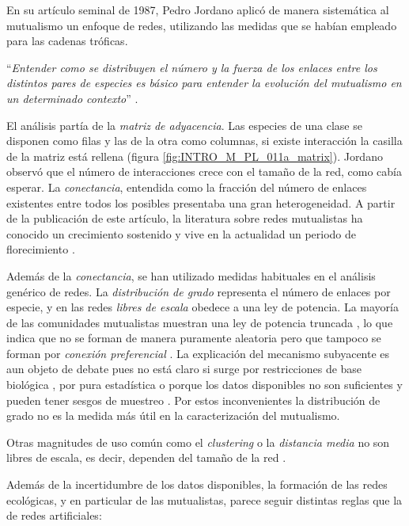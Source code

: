 En su artículo seminal de 1987, Pedro Jordano aplicó de manera sistemática al mutualismo un enfoque de redes, utilizando las medidas que se habían empleado para las cadenas tróficas.

\enquote{\itshape Entender como se distribuyen el número y la fuerza de los enlaces entre los distintos pares de especies es básico para entender la evolución del mutualismo en un determinado contexto} \cite{jordano1987patterns}.

El análisis partía de la \textit{matriz de adyacencia}. Las especies de una clase se disponen como filas y las de la otra como columnas, si existe interacción la casilla de la matriz está rellena (figura \ref{fig:INTRO_M_PL_011a_matrix}). Jordano observó que el número de interacciones crece con el tamaño de la red, como cabía esperar. La \textit{conectancia}, entendida como la fracción del número de enlaces existentes entre todos los posibles presentaba una gran heterogeneidad. A partir de la publicación de este artículo, la literatura sobre redes mutualistas ha conocido un crecimiento sostenido y vive en la actualidad un periodo de florecimiento \cite{gu2015emerging}.

Además de la \textit{conectancia}, se han utilizado medidas habituales en el análisis genérico de redes. La \textit{distribución de grado} representa el número de enlaces por especie, y en las redes \textit{libres de escala} obedece a una ley de potencia. La mayoría de las comunidades mutualistas muestran una ley de potencia truncada \cite{jordano2003invariant}, lo que indica que no se forman de manera puramente aleatoria pero que tampoco se forman por \textit{conexión preferencial} \cite{barabasi1999emergence}. La explicación del mecanismo subyacente es aun objeto de debate pues no está claro si surge por restricciones de base biológica \cite{bascompte2007plant}, por pura estadística \cite{vazquez2005degree} o porque los datos disponibles no son suficientes y pueden tener sesgos de muestreo \cite{okuyama2008mutualistic, williams2011biology}. Por estos inconvenientes la distribución de grado no es la medida más útil en la caracterización del mutualismo.

Otras magnitudes de uso común como el \textit{clustering} o la \textit{distancia media} no son libres de escala, es decir, dependen del tamaño de la red \cite{olesen2006smallest}.

Además de la incertidumbre de los datos disponibles, la formación de las redes ecológicas, y en particular de las mutualistas, parece seguir distintas reglas que la de redes artificiales:

